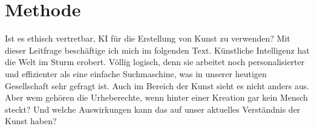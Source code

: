 \section{Methode}
\label{sec:introduction}

Ist es ethisch vertretbar, KI für die Erstellung von Kunst zu verwenden? Mit dieser Leitfrage beschäftige ich mich im folgenden Text. 
Künstliche Intelligenz hat die Welt im Sturm erobert. Völlig logisch, denn sie arbeitet noch personalisierter und effizienter als eine einfache Suchmaschine, was in unserer heutigen Gesellschaft sehr gefragt ist. Auch im Bereich der Kunst sieht es nicht anders aus. Aber wem gehören die Urheberechte, wenn hinter einer Kreation gar kein Mensch steckt? Und welche Auswirkungen kann das auf unser aktuelles Verständnis der Kunst haben?